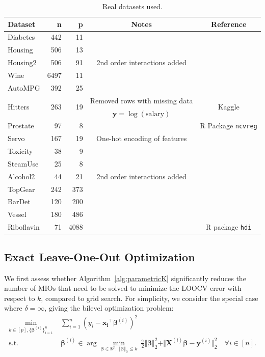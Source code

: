 \documentclass[opre,nonblindrev]{informs3} %
\begin{document}
\begin{table}[h]
\centering\footnotesize
\begin{tabular}{@{}l r r c c@{}} \toprule
Dataset & n & p & Notes & Reference\\
\midrule
Diabetes&442&11&&\cite{efron2004least}\\
Housing&506&13&&\cite{gomez2021mixed}\\
Housing2 & 506 & 91&2nd order interactions added &\cite{gomez2021mixed}\\ 
Wine & 6497 & 11&&\cite{misc_wine_quality_186} \\ 
AutoMPG & 392 & 25&&\cite{misc_auto_mpg_9}\\ 
\multirow{2}{*}{Hitters} & \multirow{2}{*}{263} & \multirow{2}{*}{19}&Removed rows with missing data& \multirow{2}{*}{Kaggle}\\ 
&&&$\bm{y}=\log(\text{salary})$&\\
Prostate & 97 & 8&&R Package \texttt{ncvreg} \\ 
Servo & 167 & 19&One-hot encoding of features &\cite{misc_servo_87}  \\ 
Toxicity & 38 & 9&&\cite{rousseeuw2009robustbase} \\ 
SteamUse & 25 & 8&&\cite{rousseeuw2009robustbase} \\ 
Alcohol2 & 44 & 21&2nd order interactions added&\cite{rousseeuw2009robustbase} \\ 
\midrule
TopGear & 242 & 373&&\cite{bottmer2022sparse}\\ 
BarDet & 120 & 200 &&\cite{ye2018sparsity}\\ 
Vessel & 180 & 486&&\cite{christidis2020split} \\ 
Riboflavin & 71 & 4088&&R package \texttt{hdi}\\
\bottomrule
\end{tabular}
\caption{Real datasets used.
}
\label{tab:datasets}
\end{table}


\subsection{Exact Leave-One-Out Optimization}\label{sec:compExactLOOCV}

We first assess whether Algorithm~\ref{alg:parametricK} significantly reduces the number of MIOs that need to be solved to minimize the LOOCV error with respect to $k$, compared to grid search. For simplicity, we consider the special case where $\delta=\infty$, giving the bilevel optimization problem:
\begin{subequations}\label{eq:paramKLOOCV}
\begin{align}
\min_{k\in [p],\{\bm{\beta}^{(i)}\}_{i=1}^n}\;&\sum_{i=1}^n (y_i -\bm{x_i}^\top \bm{\beta}^{(i)})^2\label{eq:paramKLOOCV_obj}\\
\text{s.t.} \quad  & \bm{\beta}^{(i)} \in \arg\min_{\bm{\beta} \in \mathbb{R}^p: \ \Vert\bm{\beta}\Vert_0\leq k} \ \frac{\gamma}{2}\Vert \bm{\beta}\Vert_2^2 +\Vert \bm{X}^{(i)}\bm{\beta}-\bm{y}^{(i)}\Vert_2^2\quad \forall i \in [n].\label{eq:paramKLOOCV_inner}
\end{align}
\end{subequations}
\end{document}
